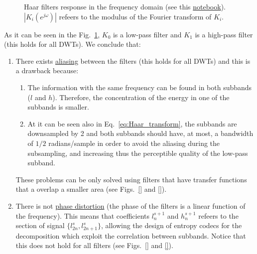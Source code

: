 \begin{figure}
  \centering
  \caption{Haar filters response in the frequency domain (see this
    \href{}{notebook}). $|K_i(e^{j\omega})|$ refeers to the
    modulus of the Fourier transform of $K_i$.}
  \label{fig:Haar_filters_response}
\end{figure}

As it can be seen in the Fig.~\ref{fig:Haar_filters_response}, $K_0$
is a low-pass filter and $K_1$ is a high-pass filter (this holds for
all DWTs). We conclude that:
\begin{enumerate}
\item There exists
  \href{https://en.wikipedia.org/wiki/Aliasing}{aliasing} between the
  filters (this holds for all DWTs) and this is a drawback because:
  \begin{enumerate}
  \item The information with the same
    frequency can be found in both subbands ($l$ and $h$). Therefore,
    the concentration of the energy in one of the subbands is
    smaller.
  \item At it can be seen also in Eq.~\ref{eq:Haar_transform}, the
    subbands are downsampled by 2 and both subbands should have, at
    most, a bandwidth of $1/2$ radians/sample in order to avoid the
    aliasing during the subsampling, and increasing thus the
    perceptible quality of the low-pass subband.
  \end{enumerate}
  These problems can be only solved using filters that have
  transfer functions that a overlap a smaller area
  (see Figs.~\ref{} and \ref{}). 
\item There is not
  \href{https://en.wikipedia.org/wiki/Linear_phase}{phase distortion}
  (the phase of the filters is a linear function of the
  frequency). This means that coefficients $l^{s+1}_n$ and $h^{s+1}_n$
  refeers to the section of signal $\{l^s_{2n}, l^s_{2n+1}\}$,
  allowing the design of entropy codecs for the decomposition which
  exploit the correlation between subbands. Notice that this does not
  hold for all filters (see Figs.~\ref{} and \ref{}).
\end{enumerate}



